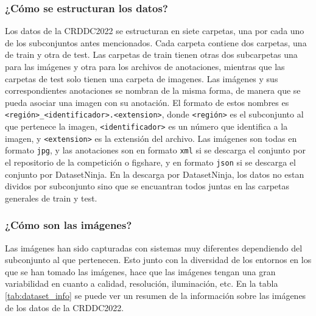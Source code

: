 \subsubsection{¿Cómo se estructuran los datos?}
Los datos de la CRDDC2022 se estructuran en siete carpetas, una por cada uno de los subconjuntos antes mencionados. Cada carpeta contiene dos carpetas, una de train y otra de test. Las carpetas de train tienen otras dos subcarpetas una para las imágenes y otra para los archivos de anotaciones, mientras que las carpetas de test solo tienen una carpeta de imagenes. Las imágenes y sus correspondientes anotaciones se nombran de la misma forma, de manera que se pueda asociar una imagen con su anotación. El formato de estos nombres es \texttt{<región>\_<identificador>.<extension>}, donde \texttt{<región>} es el subconjunto al que pertenece la imagen, \texttt{<identificador>} es un número que identifica a la imagen, y \texttt{<extension>} es la extensión del archivo. Las imágenes son todas en formato \texttt{jpg}, y las anotaciones son en formato \texttt{xml} si se descarga el conjunto por el repositorio de la competición o figshare, y en formato \texttt{json} si se descarga el conjunto por DatasetNinja. En la descarga por DatasetNinja, los datos no estan dividos por subconjunto sino que se encuantran todos juntas en las carpetas generales de train y test.


\subsubsection{¿Cómo son las imágenes?}
Las imágenes han sido capturadas con sistemas muy diferentes dependiendo del subconjunto al que pertenecen. Esto junto con la diversidad de los entornos en los que se han tomado las imágenes, hace que las imágenes tengan una gran variabilidad en cuanto a calidad, resolución, iluminación, etc. En la tabla \ref{tab:dataset_info} se puede ver un resumen de la información sobre las imágenes de los datos de la CRDDC2022.

